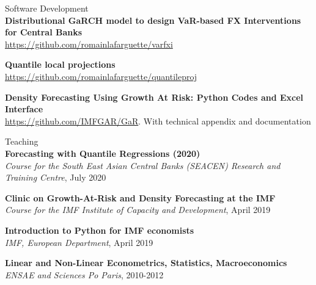 \documentclass[usegeometry, 10pt, a4paper]{cv} %
\newcommand{\activite}[1]{\textbf{#1}\ }
\begin{document}
\begin{rubriquetableau}[0.95\textwidth]{Software Development}\\

\small
\activite{Distributional GaRCH model to design VaR-based FX Interventions for Central Banks} \\
\hspace{0.6cm} \small{\url{https://github.com/romainlafarguette/varfxi}}
\vspace{0.4cm} 

\small
\activite{Quantile local projections} \\
\hspace{0.6cm} \small{\url{https://github.com/romainlafarguette/quantileproj}}
\vspace{0.4cm} 

\small
\activite{Density Forecasting Using Growth At Risk: Python Codes and Excel Interface} \\
\hspace{0.6cm} \small{\url{https://github.com/IMFGAR/GaR}. With technical
  appendix and documentation}
\vspace{0.4cm} 
\end{rubriquetableau}

\vspace{0.8cm}

\begin{rubriquetableau}[0.95\textwidth]{Teaching}\\
\small
\activite{Forecasting with Quantile Regressions (2020)} \\
\hspace{0.6cm} \small{\emph{Course for the South East Asian Central Banks (SEACEN) Research and Training Centre}, July 2020 }
\vspace{0.4cm}

  
\small
\activite{Clinic on Growth-At-Risk and Density Forecasting at the IMF} \\
\hspace{0.6cm} \small{\emph{Course for the IMF Institute of Capacity and Development}, April 2019 }
\vspace{0.4cm}


\small
\activite{Introduction to Python for IMF economists} \\
\hspace{0.6cm} \small{\emph{IMF, European Department}, April 2019 }
\vspace{0.4cm} 


\small
\activite{Linear and Non-Linear Econometrics, Statistics, Macroeconomics} \\
\hspace{0.6cm} \small{\emph{ENSAE and Sciences Po Paris}, 2010-2012}
\vspace{0.4cm} 
\end{rubriquetableau}
\end{document}
